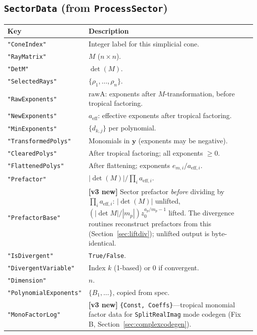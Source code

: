 \documentclass[11pt,a4paper]{article}
\begin{document}
\subsection{\texttt{SectorData} (from \texttt{ProcessSector})}
\begin{center}
\begin{tabular}{lp{9cm}}
\toprule
\textbf{Key} & \textbf{Description} \\
\midrule
\texttt{"ConeIndex"} & Integer label for this simplicial cone. \\
\texttt{"RayMatrix"} & $M$ ($n\times n$). \\
\texttt{"DetM"} & $\det(M)$. \\
\texttt{"SelectedRays"} & $\{\rho_1,\ldots,\rho_n\}$. \\
\texttt{"RawExponents"} & $\mathrm{rawA}$: exponents after $M$-transformation, before tropical factoring. \\
\texttt{"NewExponents"} & $a_{\mathrm{eff}}$: effective exponents after tropical factoring. \\
\texttt{"MinExponents"} & $\{d_{k,j}\}$ per polynomial. \\
\texttt{"TransformedPolys"} & Monomials in $\mathbf{y}$ (exponents may be negative). \\
\texttt{"ClearedPolys"} & After tropical factoring; all exponents $\geq 0$. \\
\texttt{"FlattenedPolys"} & After flattening; exponents $e_{m,i}/a_{\mathrm{eff},i}$. \\
\texttt{"Prefactor"} & $|\det(M)|/\prod_i a_{\mathrm{eff},i}$. \\
\texttt{"PrefactorBase"} & \textbf{[v3 new]} Sector prefactor \emph{before} dividing by $\prod_i a_{\mathrm{eff},i}$: $|\det(M)|$ unlifted, $(|\det M|/|m_p|)z_0^{a_p/m_p-1}$ lifted. The divergence routines reconstruct prefactors from this (Section~\ref{sec:liftdiv}); unlifted output is byte-identical. \\
\texttt{"IsDivergent"} & \texttt{True/False}. \\
\texttt{"DivergentVariable"} & Index $k$ (1-based) or 0 if convergent. \\
\texttt{"Dimension"} & $n$. \\
\texttt{"PolynomialExponents"} & $\{B_1,\ldots\}$, copied from spec. \\
\texttt{"MonoFactorLog"} & \textbf{[v3 new]} \texttt{\{Const, Coeffs\}}---tropical monomial factor data for \texttt{SplitRealImag} mode codegen (Fix B, Section~\ref{sec:complexcodegen}). \\
\bottomrule
\end{tabular}
\end{center}
\end{document}
